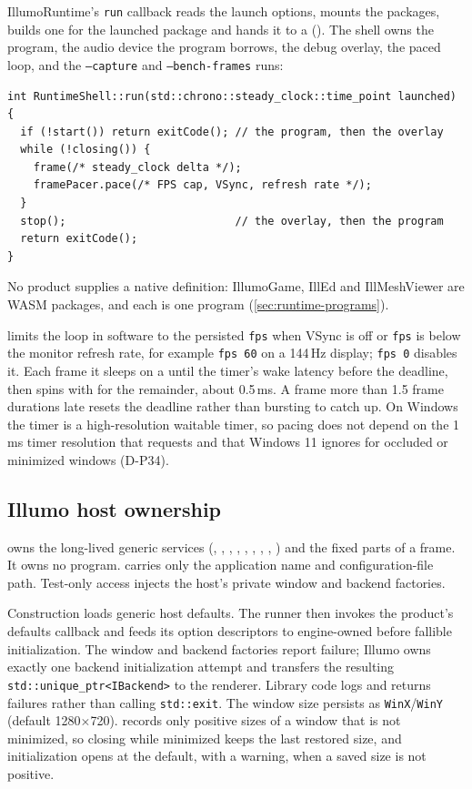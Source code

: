 IllumoRuntime's \texttt{run} callback reads the launch options, mounts the
packages, builds one  for the launched package and
hands it to a 
(). The shell owns the program,
the audio device the program borrows, the debug overlay, the paced loop, and
the \texttt{--capture} and \texttt{--bench-frames} runs:
\begin{lstlisting}
int RuntimeShell::run(std::chrono::steady_clock::time_point launched) {
  if (!start()) return exitCode(); // the program, then the overlay
  while (!closing()) {
    frame(/* steady_clock delta */);
    framePacer.pace(/* FPS cap, VSync, refresh rate */);
  }
  stop();                          // the overlay, then the program
  return exitCode();
}
\end{lstlisting}
No product supplies a native definition: IllumoGame, IllEd and IllMeshViewer
are WASM packages, and each is one program (\cref{sec:runtime-programs}).

 limits the loop in software to the persisted
\texttt{fps} when VSync is off or \texttt{fps} is below the monitor refresh
rate, for example \texttt{fps 60} on a 144\,Hz display; \texttt{fps 0}
disables it. Each frame it sleeps on a  until the
timer's wake latency before the deadline, then spins with
 for the remainder, about 0.5\,ms. A frame more
than 1.5 frame durations late resets the deadline rather than bursting to catch
up. On Windows the timer is a high-resolution waitable timer, so pacing does
not depend on the 1\,ms timer resolution that 
requests and that Windows 11 ignores for occluded or minimized windows
(D-P34).

\subsection{Illumo host ownership}
 owns the long-lived generic services
(, , ,
, , ,
, , ) and
the fixed parts of a frame. It owns no program. 
carries only the application name and configuration-file path. Test-only
access injects the host's private window and backend factories.

Construction loads generic host defaults. The runner then invokes the product's
defaults callback and feeds its option descriptors to engine-owned
 before fallible initialization. The window and backend
factories report failure; Illumo owns exactly one backend initialization attempt
and transfers the resulting \texttt{std::unique\_ptr<IBackend>} to the renderer.
Library code logs and returns failures rather than calling \texttt{std::exit}.
The window size persists as \texttt{WinX}/\texttt{WinY} (default
1280$\times$720).  records only positive sizes of a
window that is not minimized, so closing while minimized keeps the last
restored size, and initialization opens at the default, with a warning, when a
saved size is not positive.

